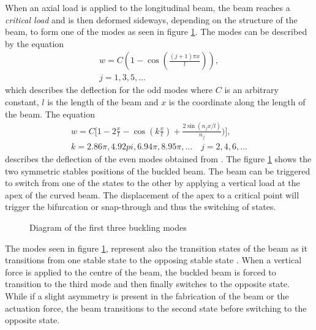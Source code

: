When an axial load is applied to the longitudinal beam, the beam reaches a \emph{critical load} and is then deformed sideways, depending on the structure of the beam, to form one of the modes as seen in figure \ref{fig:Modes_Schema}. The modes can be described by the equation
\begin{equation}
  \label{eq:modeeq1}
  \begin{split}
    w = C\left(1-\cos\left(\frac{(j+1)\pi x}{l}\right)\right), \\
    j = 1,3,5,...
  \end{split}
\end{equation}
which describes the deflection for the odd modes where $C$ is an arbitrary constant, $l$ is the length of the beam and $x$ is the coordinate along the length of the beam. The equation
\begin{equation}
  \label{eq:modeeq2}
  \begin{split}
    w = C\Big[1-2\frac{x}{l}-\cos\left(k\frac{x}{l}\right) + \frac{2\sin(n_jx/l)}{n_j})\Big], \\
    k = 2.86\pi, 4.92pi, 6.94\pi, 8.95\pi,...\quad j = 2,4,6,...
  \end{split}
\end{equation}
describes the deflection of the even modes obtained from \cite{timoshenko_theory_1962}. The figure \ref{fig:Modes_Schema} shows the two symmetric stables positions of the buckled beam. The beam can be triggered to switch from one of the states to the other by applying a vertical load at the apex of the curved beam. The displacement of the apex to a critical point will trigger the bifurcation or snap-through and thus the switching of states.

\begin{figure}[H]
	\centering
  {\tiny
	\def\svgwidth{0.4\textwidth}
	
  }
	\caption{Diagram of the first three buckling modes}
	\label{fig:Modes_Schema}
\end{figure}
The modes seen in figure \ref{fig:Modes_Schema}, represent also the transition states of the beam as it transitions from one stable state to the opposing stable state \cite{rossiter_self-switching_2006}. When a vertical force is applied to the centre of the beam, the buckled beam is forced to transition to the third mode and then finally switches to the opposite state. While if a slight asymmetry is present in the fabrication of the beam or the actuation force, the beam transitions to the second state before switching to the opposite state.

